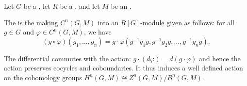 \begin{definition} \label{definition:conjugation_action_of_a_group_on_cochains_for_a_module}
    Let $G$ be a , let $R$ be a , and let $M$ be an .

    The   is the  making $C^n(G,M)$ into an $R[G]$-module given as follows: for all $g \in G$ and $\varphi \in C^n(G,M)$, we have 
    $$(g \circ \varphi)(g_1,\ldots,g_n) = g \cdot \varphi(g^{-1} g_1 g, g^{-1} g_2 g, \ldots, g^{-1} g_n g).$$

    The differential commutes with the action: $g \cdot (d\varphi) = d(g \cdot \varphi)$ and hence the action preserves cocycles and coboundaries. It thus induces a well defined action on the cohomology groups $H^n(G,M) \cong Z^n(G,M)/ B^n(G,M)$.
\end{definition}